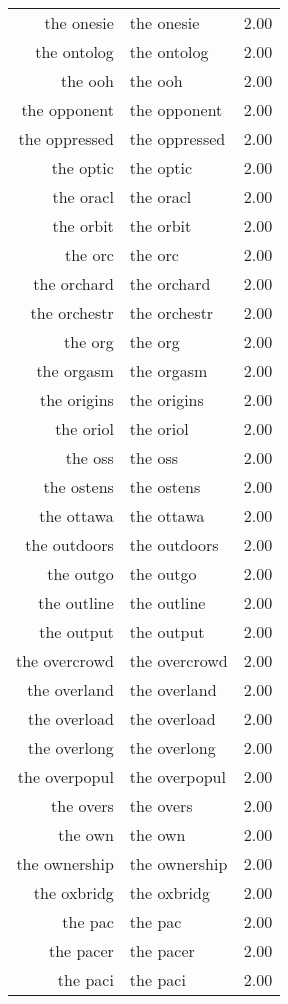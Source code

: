 \begin{table}[ht]
\begin{tabular}{rlr}
  the onesie & the onesie & 2.00 \\ 
  the ontolog & the ontolog & 2.00 \\ 
  the ooh & the ooh & 2.00 \\ 
  the opponent & the opponent & 2.00 \\ 
  the oppressed & the oppressed & 2.00 \\ 
  the optic & the optic & 2.00 \\ 
  the oracl & the oracl & 2.00 \\ 
  the orbit & the orbit & 2.00 \\ 
  the orc & the orc & 2.00 \\ 
  the orchard & the orchard & 2.00 \\ 
  the orchestr & the orchestr & 2.00 \\ 
  the org & the org & 2.00 \\ 
  the orgasm & the orgasm & 2.00 \\ 
  the origins & the origins & 2.00 \\ 
  the oriol & the oriol & 2.00 \\ 
  the oss & the oss & 2.00 \\ 
  the ostens & the ostens & 2.00 \\ 
  the ottawa & the ottawa & 2.00 \\ 
  the outdoors & the outdoors & 2.00 \\ 
  the outgo & the outgo & 2.00 \\ 
  the outline & the outline & 2.00 \\ 
  the output & the output & 2.00 \\ 
  the overcrowd & the overcrowd & 2.00 \\ 
  the overland & the overland & 2.00 \\ 
  the overload & the overload & 2.00 \\ 
  the overlong & the overlong & 2.00 \\ 
  the overpopul & the overpopul & 2.00 \\ 
  the overs & the overs & 2.00 \\ 
  the own & the own & 2.00 \\ 
  the ownership & the ownership & 2.00 \\ 
  the oxbridg & the oxbridg & 2.00 \\ 
  the pac & the pac & 2.00 \\ 
  the pacer & the pacer & 2.00 \\ 
  the paci & the paci & 2.00 \\ 

\end{tabular}
\end{table}
